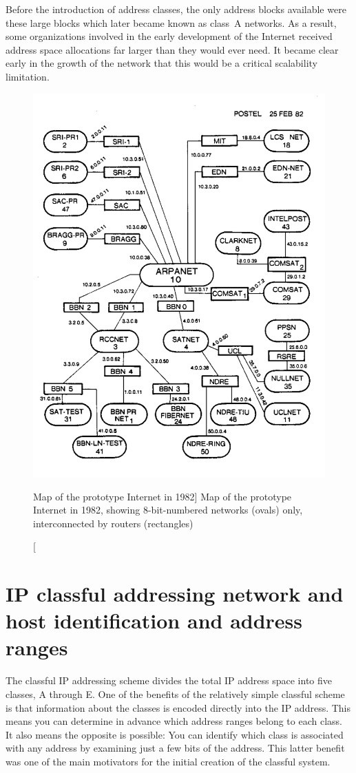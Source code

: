 Before the introduction of address classes, the only address blocks available were these large blocks which later became known as class~A networks.
As a result, some organizations involved in the early development of the Internet received address space allocations far larger than they would ever need.
It became clear early in the growth of the network that this would be a critical scalability limitation.


\begin{figure}
   \centering
   \includegraphics[width=.7\textwidth]{images/prototype-internet.png}
   \caption
      [Map of the prototype Internet in 1982]
      {Map of the prototype Internet in 1982, showing 8-bit-numbered networks (ovals) only, interconnected by routers (rectangles)}
   \label{fig:prototype-internet}
\end{figure}


\section{IP classful addressing network and host identification and address ranges}

The classful IP addressing scheme divides the total IP address space
into five classes, A through E. One of the benefits of the relatively
simple classful scheme is that information about the classes is encoded
directly into the IP address. This means you can determine in advance
which address ranges belong to each class. It also means the opposite is
possible: You can identify which class is associated with any address by
examining just a few bits of the address. This latter benefit was one of
the main motivators for the initial creation of the classful
system.


